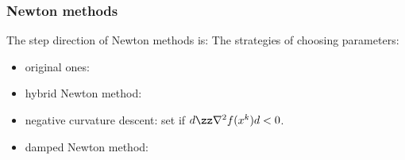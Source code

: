 	\subsubsection{Newton methods}
	The step direction of Newton methods is:
	The strategies of choosing parameters:
	\begin{itemize}
		\item original ones: \\[1mm]
		\item hybrid Newton method: 
		\item negative curvature descent: set  if $d\zz \nabla^2 f(x^k) d<0$.
		\item damped Newton method: \\[1mm]
	\end{itemize}


